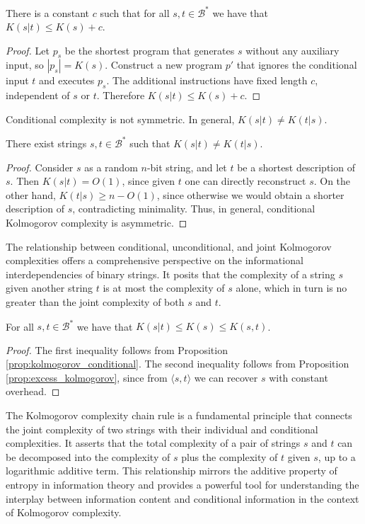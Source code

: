 \begin{proposition}
\label{prop:kolmogorov_conditional}
There is a constant $c$ such that for all $s, t \in \mathcal{B}^{\ast}$ we have that $K(s | t ) \leq K(s) + c$.
\end{proposition}
\begin{proof}
Let $p_s$ be the shortest program that generates $s$ without any auxiliary input, so $|p_s| = K(s)$. Construct a new program $p'$ that ignores the conditional input $t$ and executes $p_s$. The additional instructions have fixed length $c$, independent of $s$ or $t$. Therefore $K(s|t) \leq K(s) + c$.
\end{proof}

Conditional complexity is not symmetric. In general, $K(s|t) \neq K(t|s)$.

\begin{proposition}
There exist strings $s, t \in \mathcal{B}^{\ast}$ such that $K(s|t) \neq K(t|s)$.
\end{proposition}
\begin{proof}
Consider $s$ as a random $n$-bit string, and let $t$ be a shortest description of $s$. Then $K(s|t) = O(1)$, since given $t$ one can directly reconstruct $s$. On the other hand, $K(t|s) \geq n - O(1)$, since otherwise we would obtain a shorter description of $s$, contradicting minimality. Thus, in general, conditional Kolmogorov complexity is asymmetric.
\end{proof}

The relationship between conditional, unconditional, and joint Kolmogorov complexities offers a comprehensive perspective on the informational interdependencies of binary strings. It posits that the complexity of a string $s$ given another string $t$ is at most the complexity of $s$ alone, which in turn is no greater than the joint complexity of both $s$ and $t$. 

\begin{proposition}
\label{prop:kolmogorov_relations}
For all $s, t\in\mathcal{B}^{\ast}$ we have that $K(s | t ) \leq K(s) \leq K(s, t)$.
\end{proposition}
\begin{proof}
The first inequality follows from Proposition \ref{prop:kolmogorov_conditional}. The second inequality follows from Proposition \ref{prop:excess_kolmogorov}, since from $\langle s,t\rangle$ we can recover $s$ with constant overhead.
\end{proof}

The Kolmogorov complexity chain rule is a fundamental principle that connects the joint complexity of two strings with their individual and conditional complexities. It asserts that the total complexity of a pair of strings $s$ and $t$ can be decomposed into the complexity of $s$ plus the complexity of $t$ given $s$, up to a logarithmic additive term. This relationship mirrors the additive property of entropy in information theory and provides a powerful tool for understanding the interplay between information content and conditional information in the context of Kolmogorov complexity.

